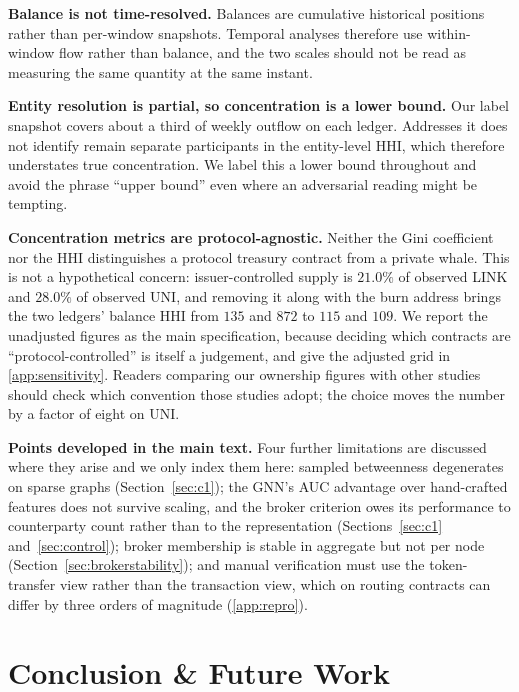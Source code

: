 \documentclass[final,5p,times]{elsarticle}
\begin{document}
\textbf{Balance is not time-resolved.} Balances are cumulative historical
positions rather than per-window snapshots. Temporal analyses therefore use
within-window flow rather than balance, and the two scales should not be
read as measuring the same quantity at the same instant.

\textbf{Entity resolution is partial, so concentration is a lower bound.}
Our label snapshot covers about a third of weekly outflow on each ledger.
Addresses it does not identify remain separate participants in the
entity-level HHI, which therefore understates true concentration. We label
this a lower bound throughout and avoid the phrase ``upper bound'' even
where an adversarial reading might be tempting.

\textbf{Concentration metrics are protocol-agnostic.} Neither the Gini
coefficient nor the HHI distinguishes a protocol treasury contract from a
private whale. This is not a hypothetical concern: issuer-controlled supply
is $21.0\%$ of observed LINK and $28.0\%$ of observed UNI, and removing it
along with the burn address brings the two ledgers' balance HHI from $135$
and $872$ to $115$ and $109$. We report the unadjusted figures as the main
specification, because deciding which contracts are ``protocol-controlled''
is itself a judgement, and give the adjusted grid in
\ref{app:sensitivity}. Readers comparing our ownership figures with
other studies should check which convention those studies adopt; the choice
moves the number by a factor of eight on UNI.

\FloatBarrier

\textbf{Points developed in the main text.} Four further limitations are
discussed where they arise and we only index them here: sampled betweenness
degenerates on sparse graphs (Section~\ref{sec:c1}); the GNN's AUC
advantage over hand-crafted features does not survive scaling, and the
broker criterion owes its performance to counterparty count rather than to
the representation (Sections~\ref{sec:c1} and~\ref{sec:control});
broker membership is stable in aggregate but not per node
(Section~\ref{sec:brokerstability}); and manual verification must use the
token-transfer view rather than the transaction view, which on routing
contracts can differ by three orders of magnitude (\ref{app:repro}).

\section{Conclusion \& Future Work}
\label{sec:conclusion}
\end{document}
